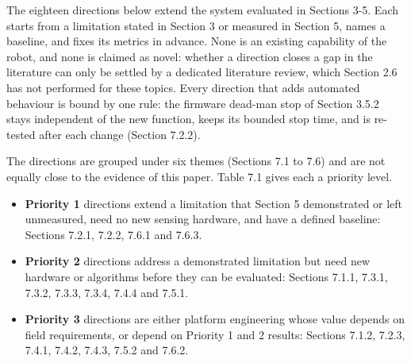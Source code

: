 The eighteen directions below extend the system evaluated in Sections 3-5. Each starts from a limitation stated in Section 3 or measured in Section 5, names a baseline, and fixes its metrics in advance. None is an existing capability of the robot, and none is claimed as novel: whether a direction closes a gap in the literature can only be settled by a dedicated literature review, which Section 2.6 has not performed for these topics. Every direction that adds automated behaviour is bound by one rule: the firmware dead-man stop of Section 3.5.2 stays independent of the new function, keeps its bounded stop time, and is re-tested after each change (Section 7.2.2).

The directions are grouped under six themes (Sections 7.1 to 7.6) and are not equally close to the evidence of this paper. Table 7.1 gives each a priority level.

\begin{itemize}
\item \textbf{Priority 1} directions extend a limitation that Section 5 demonstrated or left unmeasured, need no new sensing hardware, and have a defined baseline: Sections 7.2.1, 7.2.2, 7.6.1 and 7.6.3.
\item \textbf{Priority 2} directions address a demonstrated limitation but need new hardware or algorithms before they can be evaluated: Sections 7.1.1, 7.3.1, 7.3.2, 7.3.3, 7.3.4, 7.4.4 and 7.5.1.
\item \textbf{Priority 3} directions are either platform engineering whose value depends on field requirements, or depend on Priority 1 and 2 results: Sections 7.1.2, 7.2.3, 7.4.1, 7.4.2, 7.4.3, 7.5.2 and 7.6.2.
\end{itemize}

